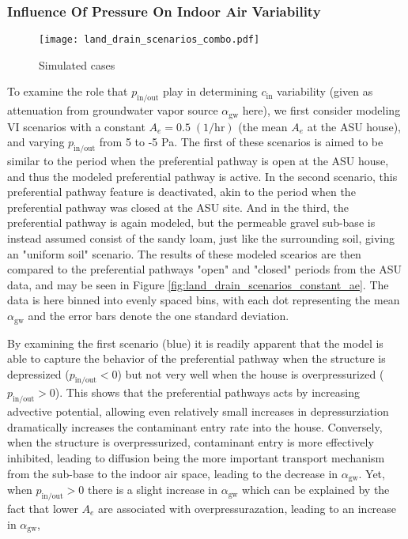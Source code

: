 \documentclass[journal=esthag,manuscript=article]{achemso}
\begin{document}
\subsubsection{Influence Of Pressure On Indoor Air Variability}

\begin{figure}[htb!]
	\centering
  \caption{Simulated cases}
  \label{fig:land_drain_scenarios}
  \texttt{[image: land\_drain\_scenarios\_combo.pdf]}
\end{figure}




To examine the role that $p_\mathrm{in/out}$ play in determining $c_\mathrm{in}$ variability (given as attenuation from groundwater vapor source $\alpha_\mathrm{gw}$ here), we first consider modeling VI scenarios with a constant $A_e = 0.5 \; \mathrm{(1/hr)}$ (the mean $A_e$ at the ASU house), and varying $p_\mathrm{in/out}$ from 5 to -5 Pa.
The first of these scenarios is aimed to be similar to the period when the preferential pathway is open at the ASU house, and thus the modeled preferential pathway is active.
In the second scenario, this preferential pathway feature is deactivated, akin to the period when the preferential pathway was closed at the ASU site.
And in the third, the preferential pathway is again modeled, but the permeable gravel sub-base is instead assumed consist of the sandy loam, just like the surrounding soil, giving an "uniform soil" scenario. %
The results of these modeled scearios are then compared to the preferential pathways "open" and "closed" periods from the ASU data, and may be seen in Figure \ref{fig:land_drain_scenarios_constant_ae}.
The data is here binned into evenly spaced bins, with each dot representing the mean $\alpha_\mathrm{gw}$ and the error bars denote the one standard deviation.

By examining the first scenario (blue) it is readily apparent that the model is able to capture the behavior of the preferential pathway when the structure is depressized ($p_\mathrm{in/out} < 0$) but not very well when the house is overpressurized ($p_\mathrm{in/out} > 0$).
This shows that the preferential pathways acts by increasing advective potential, allowing even relatively small increases in depressurziation dramatically increases the contaminant entry rate into the house.
Conversely, when the structure is overpressurized, contaminant entry is more effectively inhibited, leading to diffusion being the more important transport mechanism from the sub-base to the indoor air space, leading to the decrease in $\alpha_\mathrm{gw}$.
Yet, when $p_\mathrm{in/out} > 0$ there is a slight increase in $\alpha_\mathrm{gw}$ which can be explained by the fact that lower $A_e$ are associated with overpressurazation, leading to an increase in $\alpha_\mathrm{gw}$,
\end{document}
